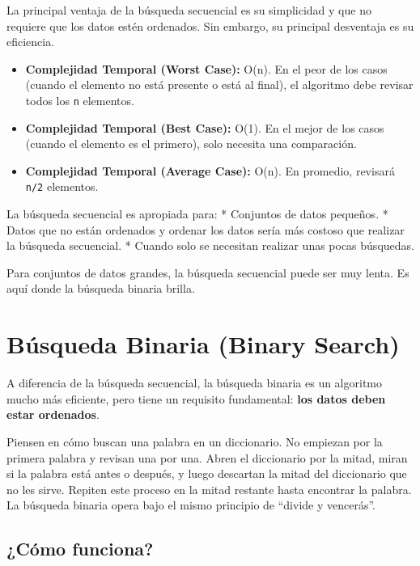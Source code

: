 \documentclass[
  spanish,
  letterpaper,
  DIV=11,
  numbers=noendperiod]{scrreprt}
\providecommand{\tightlist}{%
  \setlength{\itemsep}{0pt}\setlength{\parskip}{0pt}}
\begin{document}
La principal ventaja de la búsqueda secuencial es su simplicidad y que
no requiere que los datos estén ordenados. Sin embargo, su principal
desventaja es su eficiencia.

\begin{itemize}
\tightlist
\item
  \textbf{Complejidad Temporal (Worst Case):} O(n). En el peor de los
  casos (cuando el elemento no está presente o está al final), el
  algoritmo debe revisar todos los \texttt{n} elementos.
\item
  \textbf{Complejidad Temporal (Best Case):} O(1). En el mejor de los
  casos (cuando el elemento es el primero), solo necesita una
  comparación.
\item
  \textbf{Complejidad Temporal (Average Case):} O(n). En promedio,
  revisará \texttt{n/2} elementos.
\end{itemize}

La búsqueda secuencial es apropiada para: * Conjuntos de datos pequeños.
* Datos que no están ordenados y ordenar los datos sería más costoso que
realizar la búsqueda secuencial. * Cuando solo se necesitan realizar
unas pocas búsquedas.

Para conjuntos de datos grandes, la búsqueda secuencial puede ser muy
lenta. Es aquí donde la búsqueda binaria brilla.

\section{Búsqueda Binaria (Binary
Search)}\label{buxfasqueda-binaria-binary-search}

A diferencia de la búsqueda secuencial, la búsqueda binaria es un
algoritmo mucho más eficiente, pero tiene un requisito fundamental:
\textbf{los datos deben estar ordenados}.

Piensen en cómo buscan una palabra en un diccionario. No empiezan por la
primera palabra y revisan una por una. Abren el diccionario por la
mitad, miran si la palabra está antes o después, y luego descartan la
mitad del diccionario que no les sirve. Repiten este proceso en la mitad
restante hasta encontrar la palabra. La búsqueda binaria opera bajo el
mismo principio de ``divide y vencerás''.

\subsection{¿Cómo funciona?}\label{cuxf3mo-funciona-1}
\end{document}

